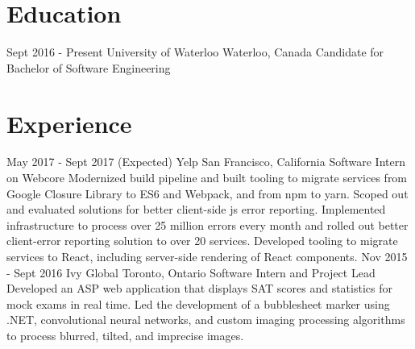 \documentclass{resume}
\begin{document}
  \begin{main}
    \vspace{5pt}%
    \section{Education}
      \begin{entrylist}
        \rightentry%
        {Sept 2016 - Present}%
        {University of Waterloo}%
        {Waterloo, Canada}%
        {Candidate for Bachelor of Software Engineering}%
        {}
      \end{entrylist}
    \section{Experience}
      \begin{entrylist}
        \rightentry%
          {May 2017 - Sept 2017 (Expected)}%
          {Yelp}%
          {San Francisco, California}%
          {Software Intern on Webcore}%
          {%
            Modernized build pipeline and built %
            tooling to migrate services from Google Closure Library to ES6 and Webpack, %
            and from npm to yarn. Scoped out and evaluated solutions for better %
            client-side js error reporting. Implemented infrastructure to process over %
            25 million errors every month and rolled out better client-error reporting %
            solution to over 20 services. Developed tooling to migrate services to %
            React, including server-side rendering of React components.%
          }
        \rightentry%
          {Nov 2015 - Sept 2016}%
          {Ivy Global}%
          {Toronto, Ontario}%
          {Software Intern and Project Lead}%
          {%
            Developed an ASP web application that displays SAT scores and statistics %
            for mock exams in real time. Led the development of a bubblesheet marker %
            using .NET, convolutional neural networks, and custom imaging processing %
            algorithms to process blurred, tilted, and imprecise images.%
          }
      \end{entrylist}

\end{main}
\end{document}
